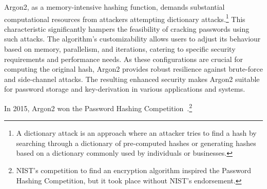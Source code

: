 Argon2, as a memory-intensive hashing function, demands substantial
computational resources from attackers attempting dictionary attacks.\footnote{
  A dictionary attack is an approach where an attacker tries to find a hash by
  searching through a dictionary of pre-computed hashes or generating hashes
  based on a dictionary commonly used by individuals or businesses.
}
This characteristic significantly hampers the feasibility of cracking passwords
using such attacks.
The algorithm's customizability allows users to adjust its behaviour based on
memory, parallelism, and iterations, catering to specific security requirements
and performance needs.
As these configurations are crucial for computing the original hash, Argon2
provides robust resilience against brute-force and side-channel attacks.
The resulting enhanced security makes Argon2 suitable for password storage and
key-derivation in various applications and systems.

In 2015, Argon2 won the Password Hashing Competition~\cite{passwordhashing}.\footnote{
  NIST's competition to find an encryption algorithm inspired the Password
  Hashing Competition, but it took place without NIST's endorsement.
}
